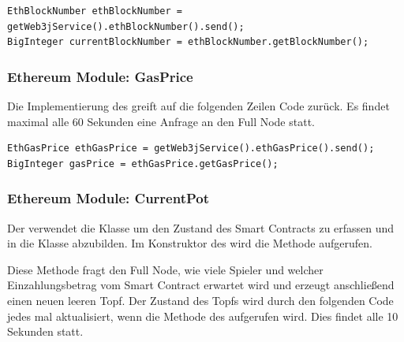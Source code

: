 \begin{lstlisting}[basicstyle=\small]
EthBlockNumber ethBlockNumber = getWeb3jService().ethBlockNumber().send();
BigInteger currentBlockNumber = ethBlockNumber.getBlockNumber();
\end{lstlisting}

\subsubsection{Ethereum Module: GasPrice}

Die Implementierung des  greift auf die folgenden Zeilen Code zurück. Es findet maximal alle 60 Sekunden eine Anfrage an den Full Node statt.

\begin{lstlisting}[basicstyle=\small]
EthGasPrice ethGasPrice = getWeb3jService().ethGasPrice().send();
BigInteger gasPrice = ethGasPrice.getGasPrice();
\end{lstlisting}


\subsubsection{Ethereum Module: CurrentPot}

Der  verwendet die Klasse  um den Zustand des Smart Contracts zu erfassen und in die Klasse  abzubilden. Im Konstruktor des  wird die Methode  aufgerufen.



Diese Methode fragt den Full Node, wie viele Spieler und welcher Einzahlungsbetrag vom Smart Contract erwartet wird und erzeugt anschließend einen neuen leeren Topf. Der Zustand des Topfs wird durch den folgenden Code jedes mal aktualisiert, wenn die  Methode des  aufgerufen wird. Dies findet alle 10 Sekunden statt.



